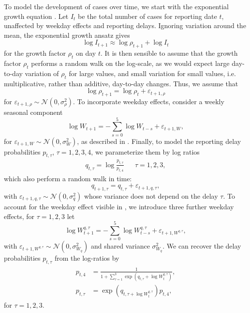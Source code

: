 To model the development of cases over time, we start with the exponential growth equation . Let $I_{t}$ be the total number of cases for reporting date $t$, unaffected by weekday effects and reporting delays. Ignoring variation around the mean, the exponential growth ansatz gives 
$$
    \log I_{t + 1} \approx \log \rho_{t + 1}  + \log I_{t}
$$
for the growth factor $\rho_{t}$ on day $t$. It is then sensible to assume that the growth factor $\rho_{t}$ performs a random walk on the log-scale, as we would expect large day-to-day variation of $\rho_{t}$ for large values, and small variation for small values, i.e. multiplicative, rather than additive, day-to-day changes. Thus, we assume that 
$$
    \log \rho_{t + 1} = \log \rho_{t} + \varepsilon_{t + 1, \rho}
$$
for $\varepsilon_{t + 1,\rho} \sim \mathcal N(0, \sigma^{2}_\rho)$. To incorporate weekday effects, consider a weekly seasonal component 
$$
    \log W_{t + 1} = - \sum_{s = 0}^{5} \log W_{t - s} + \varepsilon_{t + 1, W},
$$
for $\varepsilon_{t + 1, W} \sim \mathcal N(0, \sigma^{2}_{W})$, as described in  . Finally, to model the reporting delay probabilities $p_{t,\tau}$, $\tau = 1,2,3,4$, we parameterize them by log ratios
\begin{align*}
    q_{t, \tau} = \log \frac{p_{t,\tau}}{p_{t,4}} && \tau = 1, 2, 3,
\end{align*}
which also perform a random walk in time: 
$$
    q_{t + 1, \tau} = q_{t, \tau} + \varepsilon_{t+1, q, \tau},
$$
with $\varepsilon_{t + 1, q, \tau} \sim \mathcal N(0, \sigma^{2}_{q})$ whose variance does not depend on the delay $\tau$. To account for the weekday effect visible in , we introduce three further weekday effects, for $\tau = 1,  2, 3$ let
$$
    \log W^{q,\tau}_{t + 1} = - \sum_{s = 0}^{5} \log W^{q,\tau}_{t - s} + \varepsilon_{t + 1, W^{q,\tau}},
$$
with $\varepsilon_{t+1, W^{q,\tau}} \sim \mathcal N \left( 0, \sigma^{2}_{W_q} \right)$ and shared variance $\sigma^{2}_{W_{q}}$.
We can recover the delay probabilities $p_{t, \tau}$ from the log-ratios by 
\begin{align}
    \begin{split}
        \label{eq:p-from-log-ratios}
    p_{t, 4} &= \frac{1}{1 + \sum_{\tau = 1}^3 \exp \left( q_{t,\tau} + \log W^{q,\tau}_{t} \right)}, \\
    p_{t, \tau} &= \exp\left( q_{t, \tau + \log W^{q, \tau}_{t}} \right) p_{t, 4},
    \end{split}
\end{align}
for $\tau = 1, 2, 3$.

